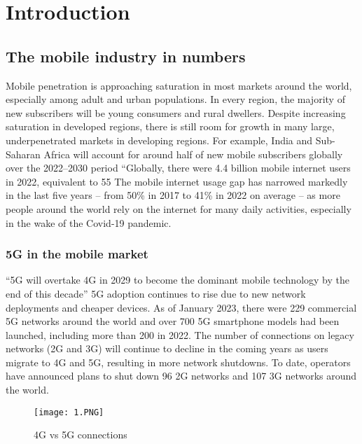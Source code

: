 \chapter{Introduction}

\section{The mobile industry in numbers}
Mobile penetration is approaching saturation in most markets around the world, especially among adult and urban populations. In every region, the majority of new subscribers will be young consumers and rural dwellers.
Despite increasing saturation in developed regions, there is still room for growth in many large, underpenetrated markets in developing regions. For example, India and Sub-Saharan Africa will account for around half of new mobile subscribers globally over the 2022–2030 period
“Globally, there were 4.4 billion mobile internet users in 2022, equivalent to 55%
The mobile internet usage gap has narrowed markedly in the last five years – from 50\% in 2017 to 41\% in 2022 on average – as more people around the world rely on the internet for many daily activities, especially in the wake of the Covid-19 pandemic. 
\subsection{5G in the mobile market}
“5G will overtake 4G in 2029 to become the dominant mobile technology by the end of this decade”
5G adoption continues to rise due to new network deployments and cheaper devices. As of January 2023, there were 229 commercial 5G networks around the world and over 700 5G smartphone models had been launched, including more than 200 in 2022. 
The number of connections on legacy networks (2G and 3G) will continue to decline in the coming years as users migrate to 4G and 5G, resulting in more network shutdowns. To date, operators have announced plans to shut down 96 2G networks and 107 3G networks around the world.

\begin{figure}[h]
\centering
\texttt{[image: 1.PNG]}
\caption{4G vs 5G connections }
\label{fig:figure1.1}
\end{figure}


